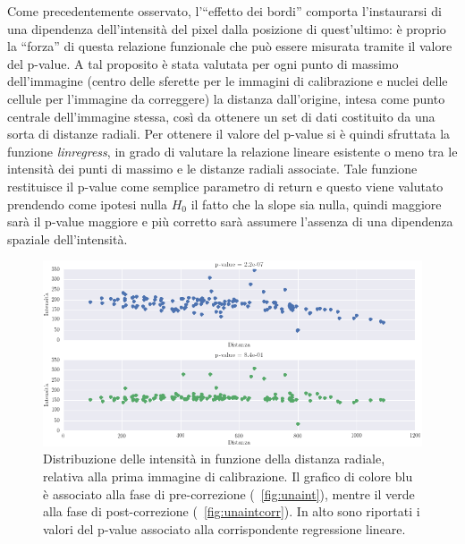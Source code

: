 Come precedentemente osservato, l'``effetto dei bordi'' comporta l'instaurarsi di una dipendenza dell'intensità del pixel dalla posizione di quest'ultimo: è proprio la ``forza'' di questa relazione funzionale che può essere misurata tramite il valore del p-value.
A tal proposito è stata valutata per ogni punto di massimo dell'immagine (centro delle sferette per le immagini di calibrazione e nuclei delle cellule per l'immagine da correggere) la distanza dall'origine, intesa come punto centrale dell'immagine stessa, così da ottenere un set di dati costituito da una sorta di distanze radiali. 
Per ottenere il valore del p-value si è quindi sfruttata la funzione \textit{linregress}, in grado di valutare la relazione lineare esistente o meno tra le intensità dei punti di massimo e le distanze radiali associate.
Tale funzione restituisce il p-value come semplice parametro di return e questo viene valutato prendendo come ipotesi nulla $H_0$ il fatto che la slope sia nulla, quindi maggiore sarà il p-value maggiore e più corretto sarà assumere l'assenza di una dipendenza spaziale dell'intensità.

\begin{figure}
 \centering
 \includegraphics[scale=.55]{img/CAP4pvalue1.png}
 \caption{\small{Distribuzione delle intensità in funzione della distanza radiale, relativa alla prima immagine di calibrazione. Il grafico di colore blu è associato alla fase di pre-correzione (\figurename~\ref{fig:unaint}), mentre il verde alla fase di post-correzione (\figurename~\ref{fig:unaintcorr}). In alto sono riportati i valori del p-value associato alla corrispondente regressione lineare.}}
 \label{fig:pvalue1}
\end{figure}

